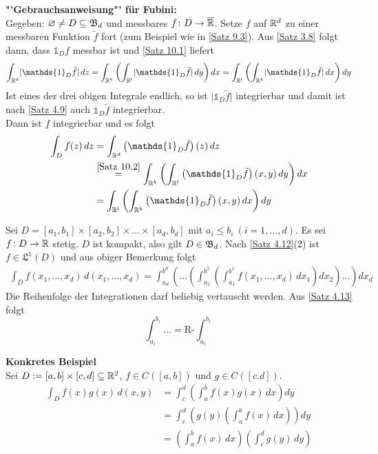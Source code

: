 \documentclass[a4paper,twoside,DIV15,BCOR12mm,chapterprefix=true,headings=onelinechapter]{scrbook}
\begin{document}
\textbf{"'Gebrauchsanweisung"' für Fubini:}\\
Gegeben: \(\varnothing\neq D\subseteq\mathfrak{B}_d\) und messbares \(f\colon D\to\overline{\mathbb{R}}\).
Setze $f$ auf \(\mathbb{R}^d\) zu einer messbaren Funktion \(\tilde f\) fort (zum Beispiel wie in \ref{Satz 9.3}).
Aus \ref{Satz 3.8} folgt dann, dass \(\mathds{1}_{D}f\) messbar ist und \ref{Satz 10.1} liefert
	\begin{align*}
	\int_{\mdr^d}\lvert \mathds{1}_{D}\tilde f\rvert\,dz 
	= \int_{\mdr^k}\left(\int_{\mdr^l}\lvert \mathds{1}_{D}\tilde f\rvert\,dy\right)dx 
	= \int_{\mdr^l}\left(\int_{\mdr^k}\lvert \mathds{1}_{D}\tilde f\rvert\,dx\right)dy
	\end{align*}
Ist eines der drei obigen Integrale endlich, so ist \(\lvert \mathds{1}_{D}\tilde f\rvert\) integrierbar und
damit ist nach \ref{Satz 4.9} auch \(\mathds{1}_{D}\tilde f\) integrierbar.\\
Dann ist $f$ integrierbar und es folgt
	\begin{align*}
	\int_Df(z)\,dz 
	& = \int_{\mdr^d}\left(\mathds{1}_{D}\tilde f\right)(z)\,dz									\\
	& \overset{\ref{Satz 10.2}}= \int_{\mdr^k}\left(\int_{\mdr^l}\left(\mathds{1}_{D}\tilde f\right)(x,y)\,dy\right)dx 	\\
	& = \int_{\mdr^l}\left(\int_{\mdr^k}\left(\mathds{1}_{D}\tilde f\right)(x,y)\,dx\right)dy
	\end{align*}

\begin{beispiel}
Sei \(D=[a_1,b_1]\times[a_2,b_2]\times\ldots\times[a_d,b_d]\) mit \(a_i\leq b_i \ (i=1,\ldots,d)\). 
Es sei \(f\colon D\to\mathbb{R}\) stetig. $D$ ist kompakt, also gilt \(D\in\mathfrak{B}_d\).
Nach \ref{Satz 4.12}(2) ist \(f\in\mathfrak{L}^1(D)\) und aus obiger Bemerkung folgt
	\begin{align*}
	\int_Df(x_1,\ldots,x_d)\,d(x_1,\ldots,x_d) 
	= \int_{a_d}^{b^d} \left(\ldots \left( \int_{a_2}^{b^2} \left(\int_{a_1}^{b^1}f(x_1,\ldots,x_d)\,dx_1\right)dx_2\right)\ldots\right)dx_d
	\end{align*}
Die Reihenfolge der Integrationen darf beliebig vertauscht werden. Aus \ref{Satz 4.13} folgt
\[\int_{a_i}^{b_i}\ldots = \text{R-}\int_{a_i}^{b_i}\]
\end{beispiel}


\textbf{Konkretes Beispiel}\\
Sei  \(D:=[a,b]\times[c,d]\subseteq\mathbb{R}^2\), \(f\in C([a,b])\) und \(g\in C([c.d])\).
	\begin{align*}
	\int_Df(x)g(x)\,d(x,y)						
	& = \int_c^d\left(\int_a^bf(x)g(x)\,dx\right)dy			\\
	& = \int_c^d\left(g(y)\left(\int_a^bf(x)\,dx\right)\right)dy		\\
	&= \left(\int_a^bf(x)\,dx\right) \left(\int_c^dg(y)\,dy\right)
	\end{align*}
\end{document}
